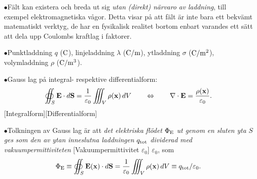 {{$$  $$}
\item{$\bullet$}{F{\"a}lt kan existera och breda ut sig {\it utan
  (direkt) n{\"a}rvaro av laddning}, till exempel elektromagnetiska
  v{\aa}gor. Detta visar p{\aa} att f{\"a}lt {\"a}r inte bara ett
  bekv{\"a}mt matematiskt verktyg, de har en fysikalisk realitet
  bortom enbart varandes ett s{\"a}tt att dela upp Coulombs kraftlag
  i faktorer.}
\item{$\bullet$}{Punktladdning $q$ (${\rm C}$),
  linjeladdning $\lambda$ (${\rm C}/{\rm m}$),
  ytladdning $\sigma$ (${\rm C}/{\rm m}^2$),
  volymladdning $\rho$ (${\rm C}/{\rm m}^3$).}
\item{$\bullet$}{Gauss lag p{\aa} integral- respektive differentialform:
  $$
    \oiint_S {\bf E}\cdot d{\bf S}
       ={{1}\over{\varepsilon_0}}\iiint_V\rho({\bf x})\,dV
    \qquad\Leftrightarrow\qquad
    \nabla\cdot{\bf E}={{\rho({\bf x})}\over{\varepsilon_0}}.
  $$[Integralform][Differentialform]}
\item{$\bullet$}{Tolkningen av Gauss lag {\"a}r att {\it det elektriska
  fl{\"o}det $\Phi_{\rm E}$ ut genom en sluten yta $S$ ges som den av ytan
  inneslutna laddningen $q_{\rm tot}$ dividerad med vakuumpermittiviteten}
  [Vakuumpermittivitet $\varepsilon_0$]
  $\varepsilon_0$, som
  $$
    \Phi_{\rm E}
       \equiv\oiint_S {\bf E}({\bf x})\cdot d{\bf S}
       ={{1}\over{\varepsilon_0}}\iiint_V\rho({\bf x})\,dV
       \equiv q_{\rm tot}/\varepsilon_0.
  $$}

}
